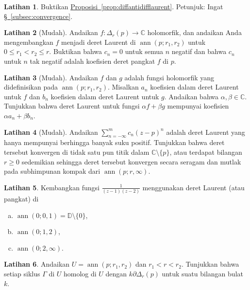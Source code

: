 \documentclass[12pt,openany]{book}
\newcommand{\ann}{\operatorname{ann}}
\newcommand{\C}{{\mathbb{C}}}
\newcommand{\D}{{\mathbb{D}}}
\theoremstyle{plain}
\theoremstyle{remark}
\theoremstyle{definition}
\newenvironment{exbox}{%
    \def\FrameCommand{\vrule width 1pt \relax\hspace{10pt}}%
    \MakeFramed{\advance\hsize-\width\FrameRestore}%
}{%
    \endMakeFramed
}
\newenvironment{exparts}{%
    \leavevmode\begin{enumerate}[a),noitemsep,topsep=0pt,parsep=0pt,partopsep=0pt]
}{%
    \end{enumerate}
}
\theoremstyle{exercise}
\newtheorem{exercise}{Latihan}[section]
\theoremstyle{example}
\newcommand{\subsectionref}[1]{\hyperref[#1]{\S~\ref*{#1}}}
\newcommand{\propref}[1]{\hyperref[#1]{Proposisi~\ref*{#1}}}
\begin{document}
\begin{exbox}
\begin{exercise}
Buktikan \propref{prop:diffantidifflaurent}.
Petunjuk: Ingat \subsectionref{subsec:convergence}.
\end{exercise}

\begin{exercise}[Mudah]
Andaikan $f \colon \Delta_r(p) \to \C$ holomorfik, dan andaikan Anda mengembangkan
$f$ menjadi deret Laurent di $\ann(p;r_1,r_2)$ untuk $0 \leq r_1 < r_2 \leq r$.
Buktikan bahwa $c_n = 0$ untuk semua $n$ negatif dan bahwa $c_n$ untuk $n$ tak negatif
adalah koefisien deret pangkat $f$ di $p$.
\end{exercise}

\begin{exercise}[Mudah]
Andaikan $f$ dan $g$ adalah fungsi holomorfik yang didefinisikan pada
$\ann(p;r_1,r_2)$. Misalkan $a_n$ koefisien dalam deret Laurent untuk
$f$ dan $b_n$ koefisien dalam deret Laurent untuk $g$. Andaikan
bahwa $\alpha,\beta \in \C$. Tunjukkan bahwa deret Laurent untuk fungsi
$\alpha f + \beta g$ mempunyai koefisien $\alpha a_n + \beta b_n$.
\end{exercise}

\begin{exercise}[Mudah]
Andaikan $\sum_{n=-\infty}^m c_n {(z-p)}^n$ adalah deret Laurent yang hanya mempunyai
berhingga banyak suku positif. Tunjukkan bahwa deret tersebut konvergen
di tidak satu pun titik dalam $\C \setminus \{ p \}$, atau terdapat bilangan $r \geq 0$ sedemikian sehingga deret tersebut
konvergen secara seragam dan mutlak pada subhimpunan kompak dari
$\ann(p;r,\infty)$.
\end{exercise}

\begin{exercise}
Kembangkan fungsi $\frac{1}{(z-1)(z-2)}$ menggunakan deret Laurent (atau pangkat) di 
\begin{exparts}
\item $\ann(0;0,1) = \D \setminus \{ 0 \}$,
\item $\ann(0;1,2)$,
\item $\ann(0;2,\infty)$.
\end{exparts}
\end{exercise}

\begin{exercise}
Andaikan $U = \ann(p;r_1,r_2)$ dan $r_1 < r < r_2$.
Tunjukkan bahwa setiap siklus $\Gamma$ di $U$ homolog di $U$
dengan $k \partial \Delta_r(p)$ untuk suatu bilangan bulat $k$.
\end{exercise}


\end{exbox}
\end{document}
